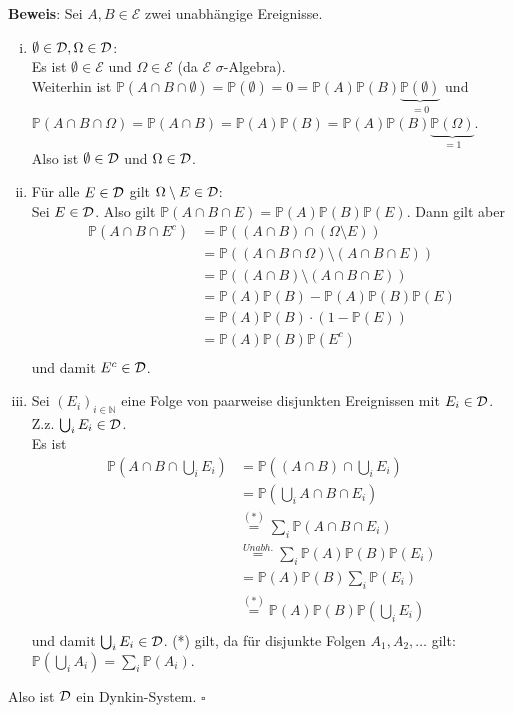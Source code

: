 \documentclass[11pt,a4paper,ngerman]{article}
\newcommand{\Prob}{\mathbb{P}}
\newcommand{\Epsilon}{\mathcal{E}}
\begin{document}
\textbf{Beweis}: Sei  $A,B \in \Epsilon$ zwei unabhängige Ereignisse.
\begin{enumerate}[(i)]
\item $\emptyset \in \mathcal{D}, \Omega \in \mathcal{D}$: \\
Es ist $\emptyset \in \Epsilon$ und $\Omega \in \Epsilon$ (da $\Epsilon$ $\sigma$-Algebra). \\
Weiterhin ist $\Prob(A \cap B \cap \emptyset) = \Prob(\emptyset) = 0 = \Prob(A) \Prob(B) \underbrace{\Prob(\emptyset)}_{=0}$ und \\
$\Prob(A \cap B \cap \Omega) = \Prob(A \cap B) = \Prob(A) \Prob(B) =  \Prob(A) \Prob(B) \underbrace{\Prob(\Omega)}_{=1}$. \\
Also ist $\emptyset \in \mathcal{D}$ und $\Omega \in \mathcal{D}$.
\item Für alle $E \in \mathcal{D}$ gilt  $\Omega \setminus E \in \mathcal{D}$: \\
Sei $E \in \mathcal{D}$. Also gilt $\Prob(A \cap B \cap E) = \Prob(A) \Prob(B) \Prob(E)$. Dann gilt aber
\begin{equation*}\begin{split}
 \Prob(A \cap B \cap E^c) &=  \Prob((A \cap B) \cap (\Omega \setminus E)) \\
&=  \Prob((A \cap B \cap \Omega) \setminus (A \cap B \cap E)) \\
&= \Prob((A \cap B) \setminus (A \cap B \cap E)) \\
&=  \Prob(A)\Prob(B) - \Prob(A)\Prob(B)\Prob(E) \\
&= \Prob(A)\Prob(B) \cdot (1 - \Prob(E)) \\
&= \Prob(A)\Prob(B) \Prob(E^c) \\
\end{split}\end{equation*}
und damit $E^c \in \mathcal{D}$.
\item Sei $\left( E_i \right)_{i \in \mathbb{N}}$ eine Folge von paarweise disjunkten Ereignissen mit $E_i \in \mathcal{D}$. \\
Z.z. $\bigcup_i E_i \in \mathcal{D}$. \\
Es ist
\begin{equation*}\begin{split}
 \Prob(A \cap B \cap \bigcup_i E_i) &=  \Prob((A \cap B) \cap \bigcup_i E_i) \\
&= \Prob(\bigcup_i A \cap B \cap E_i) \\
&\stackrel{(*)}{=} \sum_i \Prob(A \cap B \cap E_i) \\
&\stackrel{Unabh.}{=} \sum_i \Prob(A) \Prob(B) \Prob(E_i) \\
&= \Prob(A)\Prob(B) \sum_i \Prob(E_i) \\
&\stackrel{(*)}{=} \Prob(A)\Prob(B) \Prob(\bigcup_i E_i) \\
\end{split}\end{equation*}
und damit $\bigcup_i E_i \in \mathcal{D}$.
(*) gilt, da für disjunkte Folgen $A_1, A_2, \ldots$ gilt: $\Prob(\bigcup_i A_i) = \sum_i \Prob(A_i)$.
\end{enumerate}
Also ist $\mathcal{D}$ ein Dynkin-System.
\mbox{} \hfill $\square$
\end{document}
